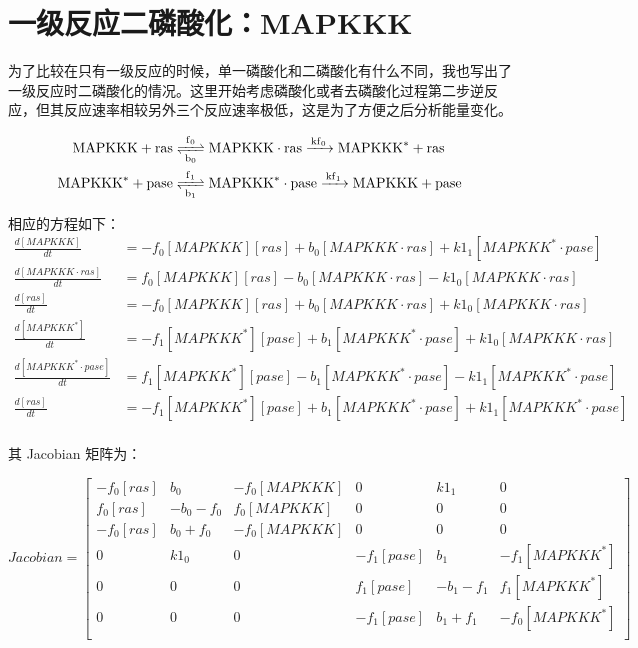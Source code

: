 \section{一级反应二磷酸化：MAPKKK}
为了比较在只有一级反应的时候，单一磷酸化和二磷酸化有什么不同，我也写出了一级反应时二磷酸化的情况。这里开始考虑磷酸化或者去磷酸化过程第二步逆反应，但其反应速率相较另外三个反应速率极低，这是为了方便之后分析能量变化。

\begin{align*}
  \ce{MAPKKK + ras &<=>[f_{0}][b_{0}] MAPKKK\cdot{}ras ->[kf_{0}] MAPKKK^{*} + ras\\
    MAPKKK^{*} + pase &<=>[f_{1}][b_{1}] MAPKKK^{*}\cdot{}pase ->[kf_{1}] MAPKKK + pase}
\end{align*}

相应的方程如下：
\small
\begin{equation*}
  \begin{align*}
    \frac{d[MAPKKK]}{dt} &= -f_{0}[MAPKKK][ras] + b_{0}[MAPKKK\cdot{}ras] + k1_{1}[MAPKKK^{*}\cdot{}pase]\\
    \frac{d[MAPKKK\cdot{}ras]}{dt} &= f_{0}[MAPKKK][ras] - b_{0}[MAPKKK\cdot{}ras] - k1_{0}[MAPKKK\cdot{}ras]\\
    \frac{d[ras]}{dt} &= -f_{0}[MAPKKK][ras] + b_{0}[MAPKKK \cdot{}ras] + k1_{0}[MAPKKK\cdot{}ras]\\
    \frac{d[MAPKKK^{*}]}{dt} &= -f_{1}[MAPKKK^{*}][pase] + b_{1}[MAPKKK^{*}\cdot{}pase] + k1_{0}[MAPKKK\cdot{}ras]\\
    \frac{d[MAPKKK^{*}\cdot{}pase]}{dt} &= f_{1}[MAPKKK^{*}][pase] - b_{1}[MAPKKK^{*}\cdot{}pase] - k1_{1}[MAPKKK^{*}\cdot{}pase]\\
    \frac{d[ras]}{dt} &= -f_{1}[MAPKKK^{*}][pase] + b_{1}[MAPKKK^{*}\cdot{}pase] + k1_{1}[MAPKKK^{*}\cdot{}pase]\\
  \end{align*}
\end{equation*}
\normalsize

其 Jacobian 矩阵为：

\small
\begin{displaymath}
  Jacobian =
  \left[
    \begin{array}{cccccc}
      -f_{0}[ras] & b_{0} & -f_{0}[MAPKKK] & 0 & k1_{1} & 0 \\
      f_{0}[ras] & -b_{0} - f_{0} & f_{0}[MAPKKK] & 0 & 0 & 0 \\
      -f_{0}[ras] & b_{0} + f_{0} & -f_{0}[MAPKKK] & 0 & 0 & 0 \\
      0 & k1_{0} & 0 & -f_{1}[pase] & b_{1} & -f_{1}[MAPKKK^{*}] \\
      0 & 0 & 0 & f_{1}[pase] & -b_{1} - f_{1} & f_{1}[MAPKKK^{*}] \\
      0 & 0 & 0 & -f_{1}[pase] & b_{1} + f_{1} & -f_{0}[MAPKKK^{*}] \\
    \end{array}
  \right]
\end{displaymath}
\normalsize

